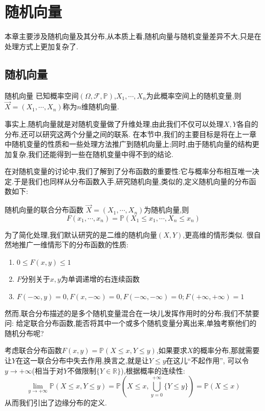 \chapter{随机向量}
本章主要涉及随机向量及其分布,从本质上看,随机向量与随机变量差异不大,只是在处理方式上更加复杂了.
\section{随机向量}
\begin{definition}{随机向量}{}
    已知概率空间$(\Omega,\mathcal{F},\mathbb{P})$,$X_1,\cdots,X_n$为此概率空间上的随机变量,则$\overrightarrow{X}=(X_1,\cdots,X_n)$称为$n$维随机向量.
\end{definition}
事实上,随机向量就是对随机变量做了升维处理,由此我们不仅可以处理$X,Y$各自的分布,还可以研究这两个分量之间的联系.
在本节中,我们的主要目标是将在上一章中随机变量的性质和一些处理方法推广到随机向量上;同时,由于随机向量的结构更加复杂,我们还能得到一些在随机变量中得不到的结论.

在对随机变量的讨论中,我们了解到了分布函数的重要性:它与概率分布相互唯一决定.于是我们也同样从分布函数入手,研究随机向量,类似的,定义随机向量的分布函数如下:
\begin{definition}{随机向量的联合分布函数}{}
    $\overrightarrow{X}=(X_1,\cdots,X_n)$为随机向量,则
    $$F(x_1,\cdots,x_n)=\mathbb{P}(X_1\leq x_1,\cdots,X_n\leq x_n)$$
\end{definition}
为了简化处理,我们默认研究的是二维的随机向量$(X,Y)$,更高维的情形类似. 很自然地推广一维情形下的分布函数的性质: 
\begin{enumerate}
    \item $0\leq F(x,y)\leq 1$
    \item $F$分别关于$x,y$为单调递增的右连续函数
    \item $F(-\infty,y)=0,F(x,-\infty)=0,F(-\infty,-\infty)=0;F(+\infty,+\infty)=1$
\end{enumerate}

然而,联合分布描述的是多个随机变量混合在一块儿发挥作用时的分布;我们不禁要问: 给定联合分布函数,能否将其中一个或多个随机变量分离出来,单独考察他们的随机分布呢?

考虑联合分布函数$F(x,y)=\mathbb{P}(X\leq x,Y\leq y)$,如果要求$X$的概率分布,那就需要让$Y$在这一联合分布中失去作用,换言之,就是让$Y\leq y$在这儿“不起作用”,
可以令$y\to +\infty$(相当于对$Y$不做限制$\{Y\in \mathbb{R}\}$),根据概率的连续性:
$$\lim_{y\to +\infty}\mathbb{P}(X\leq x,Y\leq y)=\mathbb{P}(X\leq x,\bigcup_{y=0}^{+\infty}\{Y\leq y\})=\mathbb{P}(X\leq x)$$
从而我们引出了边缘分布的定义.

